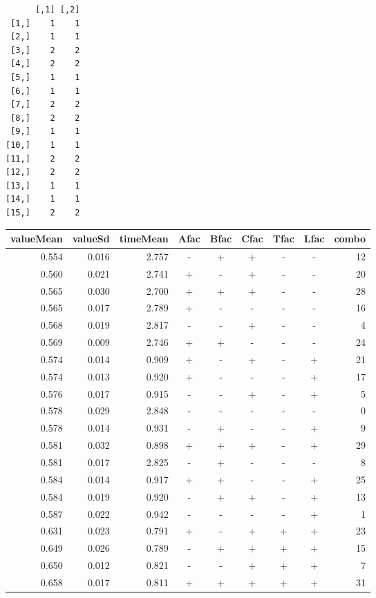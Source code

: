 \documentclass[11pt]{article}
\begin{document}
\begin{verbatim}
      [,1] [,2]
 [1,]    1    1
 [2,]    1    1
 [3,]    2    2
 [4,]    2    2
 [5,]    1    1
 [6,]    1    1
 [7,]    2    2
 [8,]    2    2
 [9,]    1    1
[10,]    1    1
[11,]    2    2
[12,]    2    2
[13,]    1    1
[14,]    1    1
[15,]    2    2
\end{verbatim}

\begin{table}[ht]
\centering
\begin{tabular}{rrrcccccr}
  \hline
valueMean & valueSd & timeMean & Afac & Bfac & Cfac & Tfac & Lfac & combo \\ 
  \hline
0.554 & 0.016 & 2.757 & - & + & + & - & - & 12 \\ 
  0.560 & 0.021 & 2.741 & + & - & + & - & - & 20 \\ 
  0.565 & 0.030 & 2.700 & + & + & + & - & - & 28 \\ 
  0.565 & 0.017 & 2.789 & + & - & - & - & - & 16 \\ 
  0.568 & 0.019 & 2.817 & - & - & + & - & - & 4 \\ 
  0.569 & 0.009 & 2.746 & + & + & - & - & - & 24 \\ 
  0.574 & 0.014 & 0.909 & + & - & + & - & + & 21 \\ 
  0.574 & 0.013 & 0.920 & + & - & - & - & + & 17 \\ 
  0.576 & 0.017 & 0.915 & - & - & + & - & + & 5 \\ 
  0.578 & 0.029 & 2.848 & - & - & - & - & - & 0 \\ 
  0.578 & 0.014 & 0.931 & - & + & - & - & + & 9 \\ 
  0.581 & 0.032 & 0.898 & + & + & + & - & + & 29 \\ 
  0.581 & 0.017 & 2.825 & - & + & - & - & - & 8 \\ 
  0.584 & 0.014 & 0.917 & + & + & - & - & + & 25 \\ 
  0.584 & 0.019 & 0.920 & - & + & + & - & + & 13 \\ 
  0.587 & 0.022 & 0.942 & - & - & - & - & + & 1 \\ 
  0.631 & 0.023 & 0.791 & + & - & + & + & + & 23 \\ 
  0.649 & 0.026 & 0.789 & - & + & + & + & + & 15 \\ 
  0.650 & 0.012 & 0.821 & - & - & + & + & + & 7 \\ 
  0.658 & 0.017 & 0.811 & + & + & + & + & + & 31 \\ 

\end{tabular}
\end{table}
\end{document}
